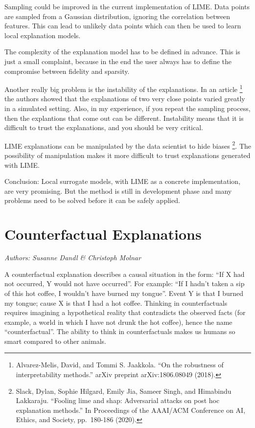 \documentclass[
  11pt,
]{scrbook}
\begin{document}
Sampling could be improved in the current implementation of LIME.
Data points are sampled from a Gaussian distribution, ignoring the correlation between features.
This can lead to unlikely data points which can then be used to learn local explanation models.

The complexity of the explanation model has to be defined in advance.
This is just a small complaint, because in the end the user always has to define the compromise between fidelity and sparsity.

Another really big problem is the instability of the explanations.
In an article \footnote{Alvarez-Melis, David, and Tommi S. Jaakkola. ``On the robustness of interpretability methods.'' arXiv preprint arXiv:1806.08049 (2018).} the authors showed that the explanations of two very close points varied greatly in a simulated setting.
Also, in my experience, if you repeat the sampling process, then the explantions that come out can be different.
Instability means that it is difficult to trust the explanations, and you should be very critical.

LIME explanations can be manipulated by the data scientist to hide biases \footnote{Slack, Dylan, Sophie Hilgard, Emily Jia, Sameer Singh, and Himabindu Lakkaraju. ``Fooling lime and shap: Adversarial attacks on post hoc explanation methods.'' In Proceedings of the AAAI/ACM Conference on AI, Ethics, and Society, pp.~180-186 (2020).}.
The possibility of manipulation makes it more difficult to trust explanations generated with LIME.

Conclusion:
Local surrogate models, with LIME as a concrete implementation, are very promising.
But the method is still in development phase and many problems need to be solved before it can be safely applied.

\newpage

\hypertarget{counterfactual}{%
\section{Counterfactual Explanations}\label{counterfactual}}

\emph{Authors: Susanne Dandl \& Christoph Molnar}

A counterfactual explanation describes a causal situation in the form: ``If X had not occurred, Y would not have occurred''.
For example: ``If I hadn't taken a sip of this hot coffee, I wouldn't have burned my tongue''.
Event Y is that I burned my tongue;
cause X is that I had a hot coffee.
Thinking in counterfactuals requires imagining a hypothetical reality that contradicts the observed facts (for example, a world in which I have not drunk the hot coffee), hence the name ``counterfactual''.
The ability to think in counterfactuals makes us humans so smart compared to other animals.
\end{document}

